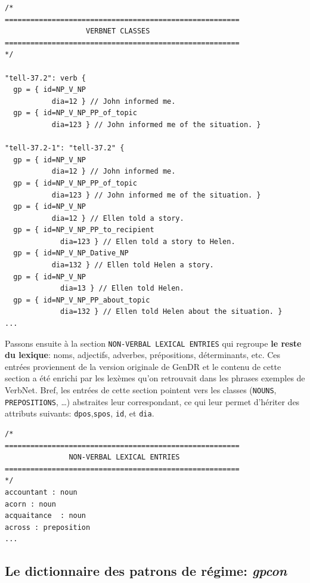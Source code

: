 \begin{lstlisting}[language=mate, caption = Extrait du \emph{lexicon}: classes de VerbNet, label=fig:vnclass]
/*
=======================================================
                   VERBNET CLASSES
=======================================================
*/

"tell-37.2": verb {
  gp = { id=NP_V_NP  
	       dia=12 } // John informed me.
  gp = { id=NP_V_NP_PP_of_topic  
	       dia=123 } // John informed me of the situation. }

"tell-37.2-1": "tell-37.2" {
  gp = { id=NP_V_NP  
	       dia=12 } // John informed me.
  gp = { id=NP_V_NP_PP_of_topic  
	       dia=123 } // John informed me of the situation. }
  gp = { id=NP_V_NP  
	       dia=12 } // Ellen told a story.
  gp = { id=NP_V_NP_PP_to_recipient 
		     dia=123 } // Ellen told a story to Helen.
  gp = { id=NP_V_NP_Dative_NP   
	       dia=132 } // Ellen told Helen a story.
  gp = { id=NP_V_NP
		     dia=13 } // Ellen told Helen.
  gp = { id=NP_V_NP_PP_about_topic
		     dia=132 } // Ellen told Helen about the situation. }
...
\end{lstlisting}

Passons ensuite à la section \texttt{NON-VERBAL LEXICAL ENTRIES} qui regroupe \textbf{le reste du lexique}: noms, adjectifs, adverbes, prépositions, déterminants, etc. Ces entrées proviennent de la version originale de GenDR \citep{lareau18} et le contenu de cette section a été enrichi par les lexèmes qu'on retrouvait dans les phrases exemples de VerbNet. Bref, les entrées de cette section pointent vers les classes (\texttt{NOUNS}, \texttt{PREPOSITIONS}, \ldots) abstraites leur correspondant, ce qui leur permet d'hériter des attributs suivants: \texttt{dpos},\texttt{spos}, \texttt{id}, et \texttt{dia}.

\begin{lstlisting}[language=mate, caption = Extrait du \emph{lexicon}: unités lexicales non-verbales]
/*
=======================================================
               NON-VERBAL LEXICAL ENTRIES     
=======================================================
*/
accountant : noun
acorn : noun
acquaitance  : noun
across : preposition
...
\end{lstlisting}

\subsection{Le dictionnaire des patrons de régime: \emph{gpcon}}

